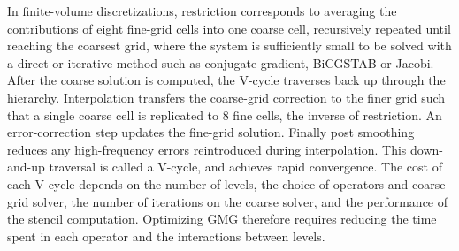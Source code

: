 \documentclass[conference]{IEEEtran}
\begin{document}
            In finite-volume discretizations, restriction corresponds to averaging the contributions of eight fine-grid cells into one coarse cell, recursively repeated %
            until reaching the coarsest grid, where the system is sufficiently small to be solved with a direct or iterative method such as conjugate gradient, BiCGSTAB or Jacobi. %
            After the coarse solution is computed, the V-cycle traverses back up through the hierarchy. Interpolation transfers the coarse-grid correction to the finer grid %
            such that a single coarse cell is replicated to 8 fine cells, the inverse of restriction. An error-correction step updates the fine-grid solution. %
            Finally post smoothing reduces any high-frequency errors reintroduced during interpolation. This down-and-up traversal is called a V-cycle, and achieves rapid convergence.
            The cost of each V-cycle depends on the number of levels, the choice of operators and coarse-grid solver, the number of iterations on the coarse solver, and the performance of the stencil computation. Optimizing GMG therefore requires reducing the time spent in each operator %
            and the interactions between levels. %
\end{document}
